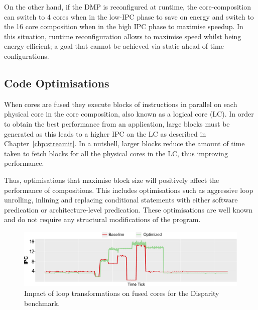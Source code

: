 On the other hand, if the DMP is reconfigured at runtime, the core-composition can switch to 4 cores when in the low-IPC phase to save on energy and switch to the 16 core composition when in the high IPC phase to maximise speedup.
In this situation, runtime reconfiguration allows to maximise speed whilst being energy efficient; a goal that cannot be achieved via static ahead of time configurations.

\subsection{Code Optimisations}

When cores are fused they execute blocks of instructions in parallel on each physical core in the core composition, also known as a logical core (LC).
In order to obtain the best performance from an application, large blocks must be generated as this leads to a higher IPC on the LC as described in Chapter~\ref{chp:streamit}.
In a nutshell, larger blocks reduce the amount of time taken to fetch blocks for all the physical cores in the LC, thus improving performance.

Thus, optimisations that maximise block size will positively affect the performance of compositions.
This includes optimisations such as aggressive loop unrolling, inlining and replacing conditional statements with either software predication or architecture-level predication.
These optimisations are well known and do not require any structural modifications of the program.

\begin{figure}[t]
    \includegraphics[width=\textwidth]{cases-paper/graphics/motivation/code_opt_3.pdf}
    \caption{Impact of loop transformations on fused cores for the Disparity benchmark.} 
    \label{fig:compmotiv}
\vspace{1em}
\end{figure}

